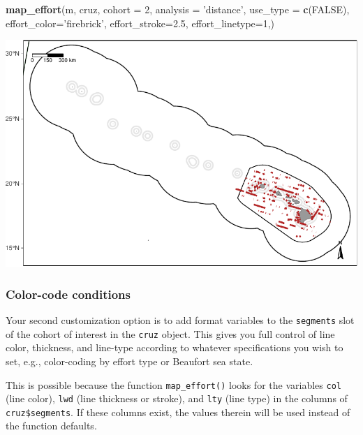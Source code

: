\documentclass[
]{book}
\newenvironment{Shaded}{\begin{snugshade}}{\end{snugshade}}
\newcommand{\DataTypeTok}[1]{\textcolor[rgb]{0.13,0.29,0.53}{#1}}
\newcommand{\DecValTok}[1]{\textcolor[rgb]{0.00,0.00,0.81}{#1}}
\newcommand{\FloatTok}[1]{\textcolor[rgb]{0.00,0.00,0.81}{#1}}
\newcommand{\KeywordTok}[1]{\textcolor[rgb]{0.13,0.29,0.53}{\textbf{#1}}}
\newcommand{\NormalTok}[1]{#1}
\newcommand{\OtherTok}[1]{\textcolor[rgb]{0.56,0.35,0.01}{#1}}
\newcommand{\StringTok}[1]{\textcolor[rgb]{0.31,0.60,0.02}{#1}}
\begin{document}
\begin{Shaded}
\begin{Highlighting}[]
\KeywordTok{map_effort}\NormalTok{(m, cruz,}
           \DataTypeTok{cohort =} \DecValTok{2}\NormalTok{,}
           \DataTypeTok{analysis =} \StringTok{'distance'}\NormalTok{,}
           \DataTypeTok{use_type =} \KeywordTok{c}\NormalTok{(}\OtherTok{FALSE}\NormalTok{),}
           \DataTypeTok{effort_color=}\StringTok{'firebrick'}\NormalTok{,}
           \DataTypeTok{effort_stroke=}\FloatTok{2.5}\NormalTok{,}
           \DataTypeTok{effort_linetype=}\DecValTok{1}\NormalTok{,)}
\end{Highlighting}
\end{Shaded}

\includegraphics{figures/unnamed-chunk-59-1.pdf}

\hypertarget{color-code-conditions}{%
\subsubsection*{Color-code conditions}\label{color-code-conditions}}

Your second customization option is to add format variables to the \texttt{segments} slot of the cohort of interest in the \texttt{cruz} object. This gives you full control of line color, thickness, and line-type according to whatever specifications you wish to set, e.g., color-coding by effort type or Beaufort sea state.

This is possible because the function \texttt{map\_effort()} looks for the variables \texttt{col} (line color), \texttt{lwd} (line thickness or stroke), and \texttt{lty} (line type) in the columns of \texttt{cruz\$segments}. If these columns exist, the values therein will be used instead of the function defaults.
\end{document}
